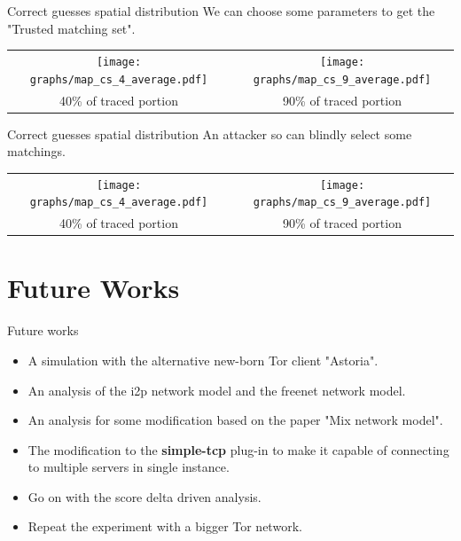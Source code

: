 	\begin{frame}{Correct guesses spatial distribution}{}
		\small We can choose some parameters to get the "Trusted matching set".
		\begin{minipage}{.9\textwidth}
			\begin{tabular}{c c}
				\texttt{[image: graphs/map\_cs\_4\_average.pdf]} &
				\texttt{[image: graphs/map\_cs\_9\_average.pdf]} \\
				\small 40\% of traced portion &
				\small 90\% of traced portion
			\end{tabular}
		\end{minipage}
	\end{frame}

	\begin{frame}{Correct guesses spatial distribution}{}
	 	\small An attacker so can blindly select some matchings.
		\begin{minipage}{.9\textwidth}
			\begin{tabular}{c c}
				\texttt{[image: graphs/map\_cs\_4\_average.pdf]}
&
				\texttt{[image: graphs/map\_cs\_9\_average.pdf]}
\\
				\small 40\% of traced portion &
				\small 90\% of traced portion
			\end{tabular}
		\end{minipage}
	\end{frame}

\section{Future Works}
\begin{frame}{Future works}{}
	\begin{itemize}
		\item A simulation with the alternative new-born Tor client "Astoria".
		\item An analysis of the i2p network model and the freenet network model.
		\item An analysis for some modification based on the paper "Mix network model".
		\item The modification to the \textbf{simple-tcp} plug-in to make it
		      capable of connecting to multiple servers in single instance.
		\item Go on with the score delta driven analysis.
		\item Repeat the experiment with a bigger Tor network.
	\end{itemize}
\end{frame}

{
\aauwavesbg
\begin{frame}
\end{frame}
}
